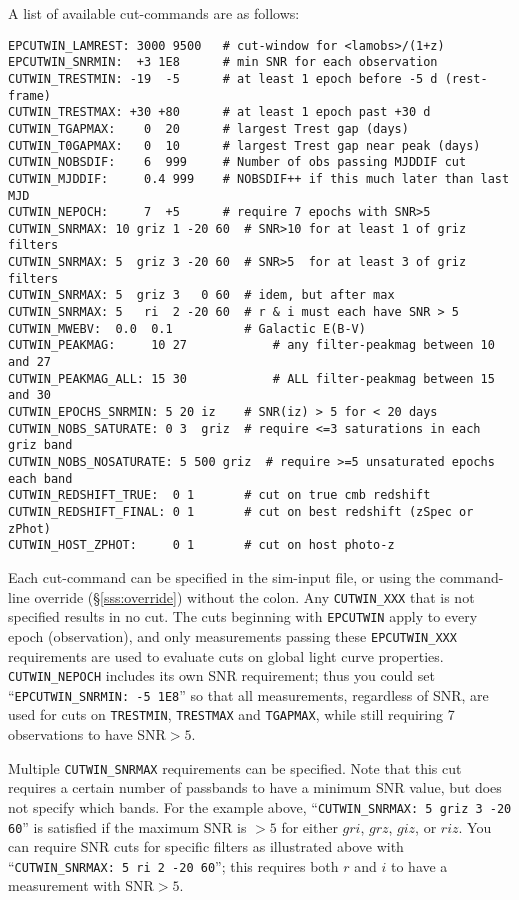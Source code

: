 \documentclass[12pt]{article}
\begin{document}
{A list of available cut-commands are as follows:
%
\begin{Verbatim}[frame=single]
EPCUTWIN_LAMREST: 3000 9500   # cut-window for <lamobs>/(1+z)
EPCUTWIN_SNRMIN:  +3 1E8      # min SNR for each observation
CUTWIN_TRESTMIN: -19  -5      # at least 1 epoch before -5 d (rest-frame) 
CUTWIN_TRESTMAX: +30 +80      # at least 1 epoch past +30 d
CUTWIN_TGAPMAX:    0  20      # largest Trest gap (days)
CUTWIN_T0GAPMAX:   0  10      # largest Trest gap near peak (days)
CUTWIN_NOBSDIF:    6  999     # Number of obs passing MJDDIF cut
CUTWIN_MJDDIF:     0.4 999    # NOBSDIF++ if this much later than last MJD
CUTWIN_NEPOCH:     7  +5      # require 7 epochs with SNR>5
CUTWIN_SNRMAX: 10 griz 1 -20 60  # SNR>10 for at least 1 of griz filters
CUTWIN_SNRMAX: 5  griz 3 -20 60  # SNR>5  for at least 3 of griz filters
CUTWIN_SNRMAX: 5  griz 3   0 60  # idem, but after max
CUTWIN_SNRMAX: 5   ri  2 -20 60  # r & i must each have SNR > 5
CUTWIN_MWEBV:  0.0  0.1          # Galactic E(B-V)
CUTWIN_PEAKMAG:     10 27            # any filter-peakmag between 10 and 27
CUTWIN_PEAKMAG_ALL: 15 30            # ALL filter-peakmag between 15 and 30
CUTWIN_EPOCHS_SNRMIN: 5 20 iz    # SNR(iz) > 5 for < 20 days
CUTWIN_NOBS_SATURATE: 0 3  griz  # require <=3 saturations in each griz band
CUTWIN_NOBS_NOSATURATE: 5 500 griz  # require >=5 unsaturated epochs each band
CUTWIN_REDSHIFT_TRUE:  0 1       # cut on true cmb redshift
CUTWIN_REDSHIFT_FINAL: 0 1       # cut on best redshift (zSpec or zPhot)
CUTWIN_HOST_ZPHOT:     0 1       # cut on host photo-z
\end{Verbatim}
%
Each cut-command can be specified in the sim-input file,
or using the command-line override (\S\ref{sss:override})
without the colon.  Any {\tt CUTWIN\_XXX} that is not specified
results in no cut.
The cuts beginning with {\tt EPCUTWIN} apply to every epoch 
(observation), and only measurements passing these {\tt EPCUTWIN\_XXX} 
requirements are used to evaluate cuts on global 
light curve properties.
{\tt CUTWIN\_NEPOCH} includes its own SNR requirement;
thus you could set ``{\tt EPCUTWIN\_SNRMIN: -5 1E8}''  so that
all measurements,  regardless of SNR, 
are used for cuts on {\tt TRESTMIN}, {\tt TRESTMAX} and {\tt TGAPMAX}, 
while still requiring 7 observations to have SNR$>5$.


Multiple {\tt CUTWIN\_SNRMAX} requirements can be specified.
Note that this cut requires a certain number of passbands to
have a minimum SNR value, but does not specify which bands.
For the example above, ``{\tt CUTWIN\_SNRMAX: 5  griz 3  -20 60}''
is satisfied if the maximum SNR is $>5$ for either $gri$,
$grz$, $giz$, or $riz$.  You can require SNR cuts for specific 
filters as illustrated above with 
``{\tt CUTWIN\_SNRMAX: 5  ri 2  -20 60}''; this requires both
$r$ and $i$ to have a measurement with SNR$>5$.


}
\end{document}
